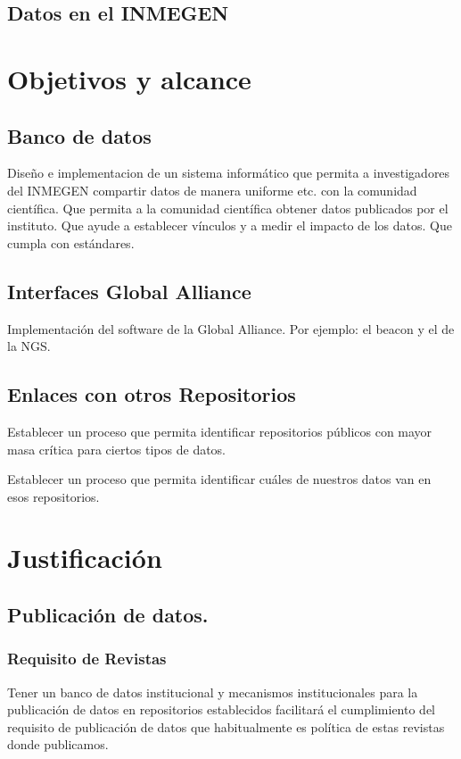 \documentclass[
10pt, %
letterpaper, %
oneside, %
headinclude,footinclude, %
BCOR5mm, %
]{scrartcl}
\begin{document}
\subsection{Datos en el INMEGEN}


\section{Objetivos y alcance}


\subsection{Banco de datos}

Diseño e implementacion de un sistema informático que permita a
investigadores del INMEGEN compartir datos de manera uniforme etc. con
la comunidad científica. Que permita a la comunidad científica obtener
datos publicados por el instituto. Que ayude a establecer vínculos y a
medir el impacto de los datos. Que cumpla con estándares.
\cite{_data_????}
\cite{altman_proposed_2007}


\subsection{Interfaces Global Alliance}
Implementación del software de la Global Alliance. Por ejemplo: el
beacon y el de la NGS.


\subsection{Enlaces con otros Repositorios}
Establecer un proceso que permita identificar repositorios públicos
con mayor masa crítica para ciertos tipos de datos.

Establecer un proceso que permita identificar cuáles de nuestros datos
van en esos repositorios.
\cite{_genebank_????}
\cite{king_introduction_2007}

\section{Justificación}

\subsection{Publicación de datos.}

\subsubsection{Requisito de Revistas}
Tener un banco de datos institucional y mecanismos institucionales
para la publicación de datos en repositorios establecidos facilitará
el cumplimiento del requisito de publicación de datos que
habitualmente es política \cite{hrynaszkiewicz} de estas revistas
donde publicamos.
\end{document}
